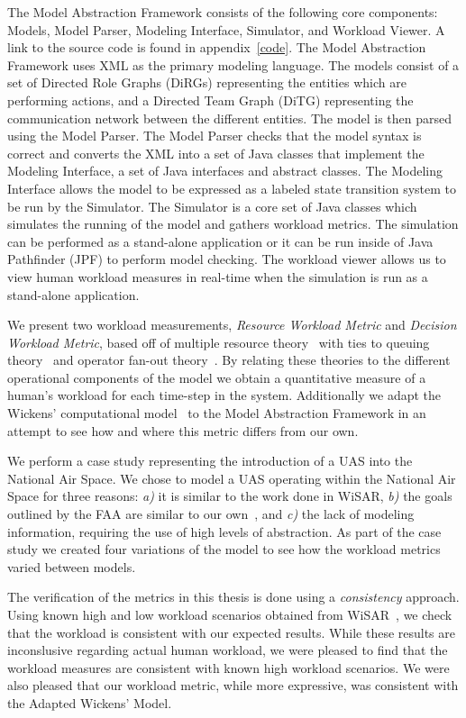 The Model Abstraction Framework consists of the following core components:  Models, Model Parser, Modeling Interface, Simulator, and Workload Viewer.  A link to the source code is found in appendix~\ref{code}.  The Model Abstraction Framework uses XML as the primary modeling language.  The models consist of a set of Directed Role Graphs (DiRGs) representing the entities which are performing actions, and a Directed Team Graph (DiTG) representing the communication network between the different entities.  The model is then parsed using the Model Parser.  The Model Parser checks that the model syntax is correct and converts the XML into a set of Java classes that implement the Modeling Interface, a set of Java interfaces and abstract classes.  The Modeling Interface allows the model to be expressed as a labeled state transition system to be run by the Simulator.  The Simulator is a core set of Java classes which simulates the running of the model and gathers workload metrics.  The simulation can be performed as a stand-alone application or it can be run inside of Java Pathfinder (JPF) to perform model checking.  The workload viewer allows us to view human workload measures in real-time when the simulation is run as a stand-alone application.

We present two workload measurements, {\em Resource Workload Metric} and {\em Decision Workload Metric}, based off of multiple resource theory~\cite{wickens2002multiple} with ties to queuing theory~\cite{newell1994unified} and operator fan-out theory~\cite{goodrich2010fanout}.  By relating these theories to the different operational components of the model we obtain a quantitative measure of a human's workload for each time-step in the system.  Additionally we adapt the Wickens' computational model~\cite{wickens2002multiple} to the Model Abstraction Framework in an attempt to see how and where this metric differs from our own.

We perform a case study representing the introduction of a UAS into the National Air Space.  We chose to model a UAS operating within the National Air Space for three reasons: {\em a)} it is similar to the work done in WiSAR, {\em b)} the goals outlined by the FAA are similar to our own~\cite{nasroadmap}, and {\em c)} the lack of modeling information, requiring the use of high levels of abstraction.  As part of the case study we created four variations of the model to see how the workload metrics varied between models.

The verification of the metrics in this thesis is done using a {\em consistency} approach.  Using known high and low workload scenarios obtained from WiSAR~\cite{Adams2009Cognitive}, we check that the workload is consistent with our expected results.  While these results are inconslusive regarding actual human workload, we were pleased to find that the workload measures are consistent with known high workload scenarios.  We were also pleased that our workload metric, while more expressive, was consistent with the Adapted Wickens' Model.

